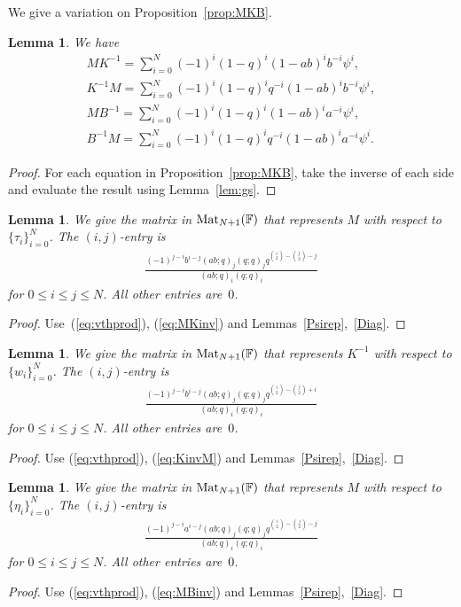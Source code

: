 \documentclass[pdftex]{sigma}
\numberwithin{equation}{section}
\newtheorem{Lemma}[Theorem]{Lemma}
\begin{document}
We give a variation on Proposition~\ref{prop:MKB}.

\begin{Lemma} We have
\begin{gather}
MK^{-1} = \sum_{i=0}^N (-1)^i (1-q)^i (1-ab)^i b^{-i} \psi^i,
\label{eq:MKinv}
\\
K^{-1}M = \sum_{i=0}^N (-1)^i (1-q)^i q^{-i} (1-ab)^i b^{-i} \psi^i,
\label{eq:KinvM}
\\
MB^{-1} = \sum_{i=0}^N (-1)^i (1-q)^i (1-ab)^i a^{-i} \psi^i,
\label{eq:MBinv}
\\
B^{-1}M = \sum_{i=0}^N (-1)^i (1-q)^i q^{-i} (1-ab)^i a^{-i} \psi^i.
\label{eq:BinvM}
\end{gather}
\end{Lemma}
\begin{proof} For each equation in Proposition~\ref{prop:MKB},
take the inverse of each side and evaluate the result using
Lemma~\ref{lem:gs}.
\end{proof}

\begin{Lemma}\label{Mtauj}
We give the matrix in
${\rm Mat}_{N+1}(\mathbb F)$ that represents $M$ with respect to
$\lbrace \tau_i \rbrace_{i=0}^N$.
The $(i,j)$-entry is
\begin{gather*}
\frac{(-1)^{j-i} b^{i-j} (ab;q)_j (q;q)_j q^{\binom{i}{2}-\binom{j}{2}-j}
}{
(ab;q)_i (q;q)_i}
\end{gather*}
for $0 \leq i\leq j\leq N$.
All other entries are~$0$.
\end{Lemma}
\begin{proof} Use~(\ref{eq:vthprod}), (\ref{eq:MKinv})
and Lemmas~\ref{Psirep},~\ref{Diag}.
\end{proof}

\begin{Lemma}\label{Kiwj}
We give the matrix in ${\rm Mat}_{N+1}(\mathbb F)$ that represents $K^{-1}$ with respect to
$\lbrace w_i \rbrace_{i=0}^N$.
The $(i,j)$-entry is
\begin{gather*}
\frac{(-1)^{j-i} b^{i-j} (ab;q)_j (q;q)_j q^{\binom{i}{2}-\binom{j}{2}+i}
}{
(ab;q)_i (q;q)_i}
\end{gather*}
for $0 \leq i\leq j\leq N$. All other entries are~$0$.
\end{Lemma}
\begin{proof} Use (\ref{eq:vthprod}), (\ref{eq:KinvM})
and Lemmas~\ref{Psirep},~\ref{Diag}.
\end{proof}

\begin{Lemma}\label{Metaj}
We give the matrix in
${\rm Mat}_{N+1}(\mathbb F)$ that represents $M$ with respect to
$\lbrace \eta_i \rbrace_{i=0}^N$.
The $(i,j)$-entry is
\begin{gather*}
\frac{(-1)^{j-i} a^{i-j} (ab;q)_j (q;q)_j q^{\binom{i}{2}-\binom{j}{2}-j}
}{
(ab;q)_i (q;q)_i}
\end{gather*}
for $0 \leq i\leq j\leq N$.
All other entries are~$0$.
\end{Lemma}
\begin{proof} Use (\ref{eq:vthprod}), (\ref{eq:MBinv}) and Lemmas~\ref{Psirep},~\ref{Diag}.
\end{proof}
\end{document}
